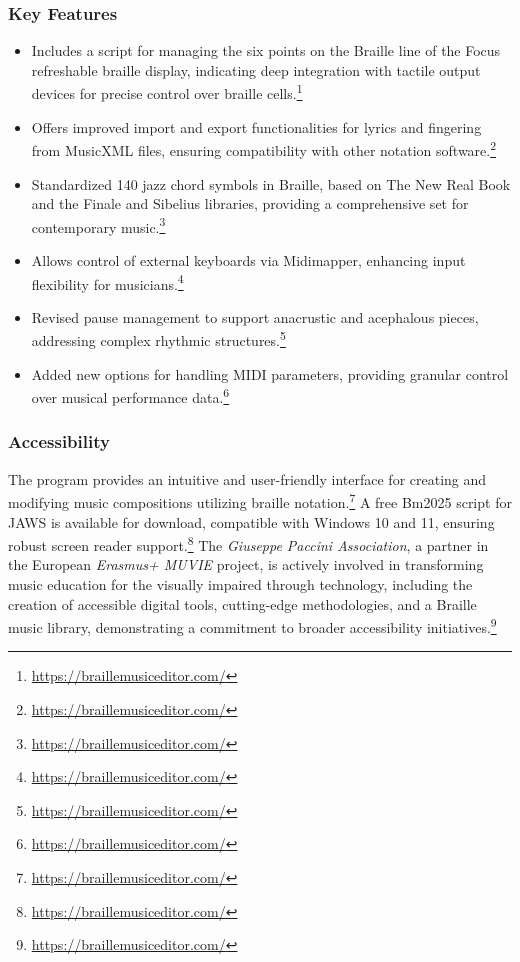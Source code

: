 \subsubsection{Key Features}
\begin{itemize}[noitemsep,topsep=0pt]
    \item Includes a script for managing the six points on the Braille line of the Focus refreshable braille display, indicating deep integration with tactile output devices for precise control over braille cells.\footnote{\url{https://braillemusiceditor.com/}}
    \item Offers improved import and export functionalities for lyrics and fingering from MusicXML files, ensuring compatibility with other notation software.\footnote{\url{https://braillemusiceditor.com/}}
    \item Standardized 140 jazz chord symbols in Braille, based on The New Real Book and the Finale and Sibelius libraries, providing a comprehensive set for contemporary music.\footnote{\url{https://braillemusiceditor.com/}}
    \item Allows control of external keyboards via Midimapper, enhancing input flexibility for musicians.\footnote{\url{https://braillemusiceditor.com/}}
    \item Revised pause management to support anacrustic and acephalous pieces, addressing complex rhythmic structures.\footnote{\url{https://braillemusiceditor.com/}}
    \item Added new options for handling MIDI parameters, providing granular control over musical performance data.\footnote{\url{https://braillemusiceditor.com/}}
\end{itemize}

\subsubsection{Accessibility}
The program provides an intuitive and user-friendly interface for creating and modifying music compositions utilizing braille notation.\footnote{\url{https://braillemusiceditor.com/}} A free Bm2025 script for JAWS is available for download, compatible with Windows 10 and 11, ensuring robust screen reader support.\footnote{\url{https://braillemusiceditor.com/}} The \textit{Giuseppe Paccini Association}, a partner in the European \textit{Erasmus+ MUVIE} project, is actively involved in transforming music education for the visually impaired through technology, including the creation of accessible digital tools, cutting-edge methodologies, and a Braille music library, demonstrating a commitment to broader accessibility initiatives.\footnote{\url{https://braillemusiceditor.com/}}

